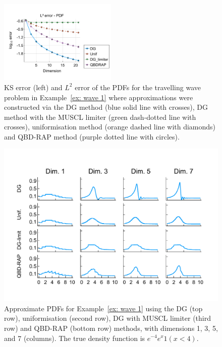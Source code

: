 \begin{example}
\begin{figure}[h]
		\includegraphics[width=0.5\textwidth,trim={0.75cm 0.8cm 0.25cm 1.25cm},clip]{chapter6/figs/wave/fun1/meshs_l2_pdf_error_formatted.pdf}
		\caption{KS error (left) and \(L^2\) error of the PDFs for the travelling wave problem in Example~\ref{ex: wave 1} where approximations were constructed via the DG method (blue solid line with crosses), DG method with the MUSCL limiter (green dash-dotted line with crosses), uniformisation method (orange dashed line with diamonds) and QBD-RAP method (purple dotted line with circles).} 
		\label{fig: fun 1 wave} 
	\end{figure}
	\begin{figure}[h]
		\centering
		\includegraphics[width=\textwidth,trim={0cm 1.25cm 0cm 1.25cm},clip]{chapter6/figs/wave/fun1/pdf_formatted.pdf}
		\caption{Approximate PDFs for Example~\ref{ex: wave 1} using the DG (top row), uniformisation (second row), DG with MUSCL limiter (third row) and QBD-RAP (bottom row) methods, with dimensions 1, 3, 5, and 7 (columns). The true density function is \(e^{-4}e^{x}1(x<4)\).} 
		\label{fig: pdf wave fun 1}
	\end{figure} 
	\exampleFloatBarrier
\end{example} 

